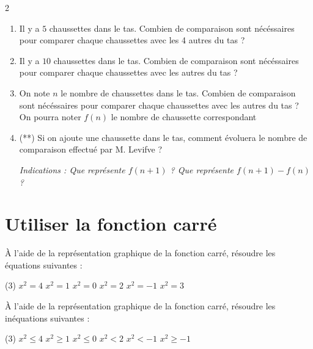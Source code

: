 \documentclass[10pt,a4paper]{article}
\begin{document}
\begin{multicols}{2}
\begin{exo}[][avance]
        \begin{enumerate}
            \item Il y a \(5\) chaussettes dans le tas. Combien de comparaison sont nécéssaires pour comparer chaque chaussettes avec les 4 autres du tas ?
            \item Il y a \(10\) chaussettes dans le tas. Combien de comparaison sont nécéssaires pour comparer chaque chaussettes avec les autres du tas ?
            \item On note \(n\) le nombre de chaussettes dans le tas.  Combien de comparaison sont nécéssaires pour comparer chaque chaussettes avec les autres du tas ? 
            \medbreak
            On pourra noter \(f(n)\) le nombre de chaussette correspondant
            \item (**) Si on ajoute une chaussette dans le tas, comment évoluera le nombre de comparaison effectué par M. Levifve ?
            
            \textit{Indications : Que représente \(f(n+1)\) ? Que représente \(f(n+1)-f(n)\) ?}
        \end{enumerate}

    \end{exo}

    \section{Utiliser la fonction carré}
    \begin{exo}
        À l'aide de la représentation graphique de la fonction carré, résoudre les équations suivantes : \begin{tasks}(3)
        \task \(x^2 = 4\)
        \task \(x^2 = 1\)
        \task \(x^2 = 0\)
        \task \(x^2 = 2\)
        \task \(x^2 = -1\)
        \task \(x^2 = 3\)
        \end{tasks}
    \end{exo}

        \begin{exo}
        À l'aide de la représentation graphique de la fonction carré, résoudre les inéquations suivantes : \begin{tasks}(3)
        \task \(x^2 \leq 4\)
        \task \(x^2 \geq 1\)
        \task \(x^2 \leq 0\)
        \task \(x^2 < 2\)
        \task \(x^2 < -1\)
        \task \(x^2 \geq -1\)
        \end{tasks}
    \end{exo}


\end{multicols}
\end{document}
